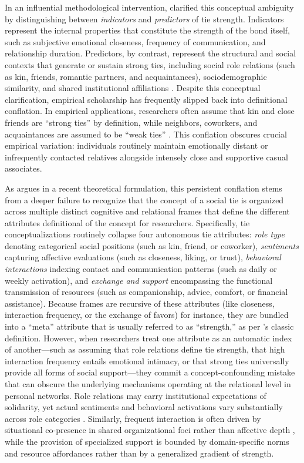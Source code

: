 \documentclass[12pt]{article}
\begin{document}
In an influential methodological intervention, \citet{marsden1984measuring} clarified this conceptual ambiguity by distinguishing between \textit{indicators} and \textit{predictors} of tie strength. Indicators represent the internal properties that constitute the strength of the bond itself, such as subjective emotional closeness, frequency of communication, and relationship duration. Predictors, by contrast, represent the structural and social contexts that generate or sustain strong ties, including social role relations (such as kin, friends, romantic partners, and acquaintances), sociodemographic similarity, and shared institutional affiliations \citep{feld1982social}. Despite this conceptual clarification, empirical scholarship has frequently slipped back into definitional conflation. In empirical applications, researchers often assume that kin and close friends are ``strong ties'' by definition, while neighbors, coworkers, and acquaintances are assumed to be ``weak ties'' \citep{lin2001social, wellman1990different}. This conflation obscures crucial empirical variation: individuals routinely maintain emotionally distant or infrequently contacted relatives alongside intensely close and supportive casual associates.

As \citet{lizardo2024theorizing} argues in a recent theoretical formulation, this persistent conflation stems from a deeper failure to recognize that the concept of a social tie is organized across multiple distinct cognitive and relational frames that define the different attributes definitional of the concept for researchers. Specifically, tie conceptualizations routinely collapse four autonomous tie attributes: \textit{role type} denoting categorical social positions (such as kin, friend, or coworker), \textit{sentiments} capturing affective evaluations (such as closeness, liking, or trust), \textit{behavioral interactions} indexing contact and communication patterns (such as daily or weekly activation), and \textit{exchange and support} encompassing the functional transmission of resources (such as companionship, advice, comfort, or financial assistance). Because frames are recursive of these attributes (like closeness, interaction frequency, or the exchange of favors) for instance, they are bundled into a ``meta'' attribute that is usually referred to as ``strength,'' as per \citet{granovetter1973strength}'s classic definition. However, when researchers treat one attribute as an automatic index of another---such as assuming that role relations define tie strength, that high interaction frequency entails emotional intimacy, or that strong ties universally provide all forms of social support---they commit a concept-confounding mistake that can obscure the underlying mechanisms operating at the relational level in personal networks. Role relations may carry institutional expectations of solidarity, yet actual sentiments and behavioral activations vary substantially across role categories \citep{marsden1984measuring}. Similarly, frequent interaction is often driven by situational co-presence in shared organizational foci rather than affective depth \citep{feld1982social, kitts2014beyond}, while the provision of specialized support is bounded by domain-specific norms and resource affordances rather than by a generalized gradient of strength.
\end{document}
